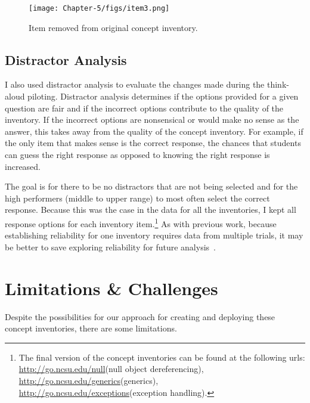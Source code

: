 	
	\begin{figure}[]
		\centering
		\texttt{[image: Chapter-5/figs/item3.png]}
		\caption{Item removed from original concept inventory. \label{fig:item3}}
	\end{figure}

\subsection{Distractor Analysis}
I also used distractor analysis to evaluate the changes made during the think-aloud piloting. Distractor analysis determines if the options provided for a given question are fair and if the incorrect options contribute to the quality of the inventory. If the incorrect options are nonsensical or would make no sense as the answer, this takes away from the quality of the concept inventory. For example, if the only item that makes sense is the correct response, the chances that students can guess the right response as opposed to knowing the right response is increased.

The goal is for there to be no distractors that are not being selected and for the high performers (middle to upper range) to most often select the correct response. Because this was the case in the data for all the inventories, I kept all response options for each inventory item.\footnote{The final version of the concept inventories can be found at the following urls: \url{http://go.ncsu.edu/null}(null object dereferencing), \url{http://go.ncsu.edu/generics}(generics), \url{http://go.ncsu.edu/exceptions}(exception handling).}
As with previous work, because establishing reliability for one inventory requires data from multiple trials, it may be better to save exploring reliability for future analysis~\cite{tew2010developing,tew2010assessing}.


	


\section{Limitations \& Challenges}\label{sec:limits}

Despite the possibilities for our approach for creating and deploying these concept inventories, there are some limitations. 

